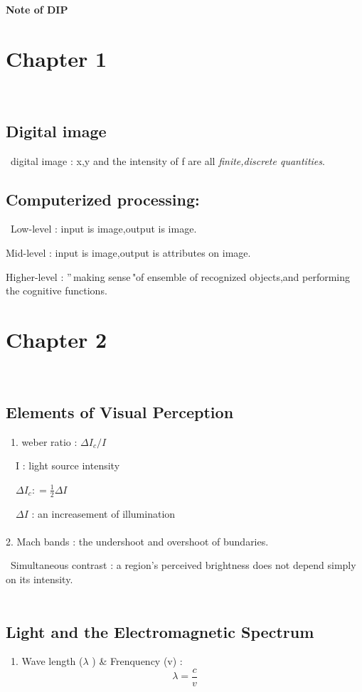 \documentclass[12pt]{article}
\begin{document}
\begin{center}
\color{RED}
\huge
{\textbf{Note of DIP}}
\end{center}
\section{Chapter 1}\
\subsection{Digital image}\
digital image : x,y and the intensity of f are all \textsl{finite,discrete quantities}.
\\
\subsection{Computerized processing:}\
Low-level : input is image,output is image.

Mid-level : input is image,output is attributes on image.

Higher-level : ''\,making sense\,"of ensemble of recognized objects,and performing the cognitive functions.
\\
\section{Chapter 2}\
\subsection{Elements of Visual Perception}\
1. weber ratio : \begin{math} \Delta I_c/I \end{math}

\ \ I : light source intensity

\ \ \begin{math} \Delta I_c : = \frac12 \Delta I \end{math}

\ \ \begin{math} \Delta I \end{math} : an increasement of illumination\\
\\
2. Mach bands : the undershoot and overshoot of bundaries.

\ Simultaneous contrast : a region's perceived brightness does not depend simply on its intensity.\\
\\
\subsection{Light and the Electromagnetic Spectrum }\
1. Wave length (\begin{math} \lambda \end{math} ) \&  Frenquency (v) :
\begin{displaymath}
\lambda = \frac{c}{v}
\end{displaymath}
\end{document}

